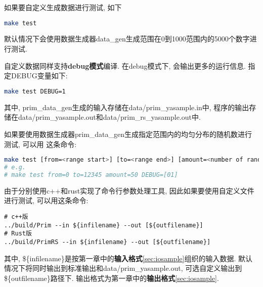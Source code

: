如果要自定义生成数据进行测试, 如下
\begin{lstlisting}[language=bash]
make test
\end{lstlisting}
默认情况下会使用数据生成器data\_gen生成范围在0到1000范围内的5000个数字进行测试.\par

自定义数据同样支持\textbf{debug模式}编译. 在debug模式下, 会输出更多的运行信息.
指定DEBUG变量如下:
\begin{lstlisting}[language=bash]
make test DEBUG=1
\end{lstlisting}

其中, prim\_data\_gen生成的输入存储在data/prim\_yasample.in中,
程序的输出存储在data/prim\_yasample.out和data/prim\_rs\_yasample.out中. \par

如果要使用数据生成器prim\_data\_gen生成指定范围内的均匀分布的随机数进行测试, 可以用
这条命令:
\begin{lstlisting}[language=bash]
make test [from=<range start>] [to=<range end>] [amount=<number of random numbers>]
# e.g. 
# make test from=0 to=12345 amount=50 DEBUG=[01]
\end{lstlisting}

由于分别使用c++和rust实现了命令行参数处理工具, 因此如果要使用自定义文件进行测试,
可以用这条命令:
\begin{lstlisting}
# c++版
../build/Prim --in ${infilename} --out [${outfilename}]
# Rust版
../build/PrimRS --in ${infilename} --out [${outfilename}]
\end{lstlisting}
其中, \$\{infilename\}是按第一章中的\textbf{输入格式}\ref{sec:iosample}组织的输入数据.
默认情况下将同时输出到标准输出和data/prim_yasample.out, 可选自定义输出到
\$\{outfilename\}路径下. 输出格式为第一章中的\textbf{输出格式}\ref{sec:iosample}.

